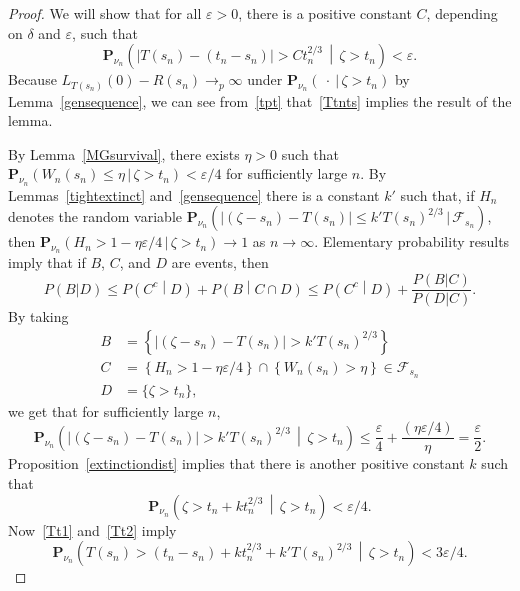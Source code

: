 \documentclass[10pt]{amsart}
\theoremstyle{definition}\newtheorem{defi}[theo]{Definition}\newtheorem{rema}[theo]{Remark}\newtheorem{exam}[theo]{Example}\newtheorem{exem}[theo]{Example}\newtheorem{nota}[theo]{Notation}
\newcommand*\eps{\varepsilon}
\renewcommand*\P{\mathbf{P}}
\newcommand\F{\mathcal{F}}
\newcommand{\1} {\mathds{1}}
\begin{document}
\begin{proof}
We will show that for all $\eps > 0$, there is a positive constant $C$, depending on $\delta$ and $\eps$, such that
\begin{equation}\label{Ttnts}
\P_{\nu_n}\left(\left|T(s_n) - (t_n - s_n)\right| > C t_n^{2/3} \,\middle|\, \zeta > t_n\right) < \eps.
\end{equation}
Because $L_{T(s_n)}(0) - R(s_n) \rightarrow_p \infty$ under $\P_{\nu_n}(\: \cdot \:|\,\zeta > t_n)$ by Lemma~\ref{gensequence}, we can see from~\eqref{tpt} that~\eqref{Ttnts} implies the result of the lemma.

By Lemma~\ref{MGsurvival}, there exists $\eta > 0$ such that $\P_{\nu_n}(W_n(s_n) \leq \eta\,|\,\zeta > t_n) < \eps/4$ for sufficiently large $n$. By Lemmas~\ref{tightextinct} and~\ref{gensequence} there is a constant $k'$ such that, if $H_n$ denotes the random variable $\P_{\nu_n}(|(\zeta - s_n) - T(s_n)| \leq k' T(s_n)^{2/3}\,|\,\F_{s_n})$, then $\P_{\nu_n}(H_n > 1 - \eta \eps/4 \,|\, \zeta > t_n) \rightarrow 1$ as $n \rightarrow \infty$. Elementary probability results imply that if $B$, $C$, and $D$ are events, then
\[
P(B|D) \leq P\left(C^c\middle|D\right) + P\left(B\middle|C \cap D\right) \leq P\left(C^c\middle|D\right) + \frac{P(B|C)}{P(D|C)}.
\]
By taking
\begin{align*}
B &= \left\{\left|(\zeta - s_n) - T(s_n)\right| > k'T(s_n)^{2/3}\right\} \\
C &= \left\{H_n > 1 - \eta \eps/4\right\} \cap \left\{W_n(s_n) > \eta\right\} \in \F_{s_n} \\
D &= \{\zeta > t_n\},
\end{align*}
we get that for sufficiently large $n$,
\begin{equation}\label{Tt1}
\P_{\nu_n}\left(\left|(\zeta - s_n) - T(s_n)\right| > k'T(s_n)^{2/3} \,\middle|\, \zeta > t_n\right) \leq \frac{\eps}{4} + \frac{(\eta \eps/4)}{\eta} = \frac{\eps}{2}.
\end{equation}
Proposition~\ref{extinctiondist} implies that there is another positive constant $k$ such that
\begin{equation}\label{Tt2}
\P_{\nu_n}\left(\zeta > t_n + kt_n^{2/3} \,\middle|\, \zeta > t_n\right) < \eps/4.
\end{equation}
Now~\eqref{Tt1} and~\eqref{Tt2} imply
\begin{equation}\label{Tt3}
\P_{\nu_n}\left(T(s_n) > (t_n - s_n) + kt_n^{2/3} + k'T(s_n)^{2/3} \,\middle|\, \zeta > t_n\right) < 3 \eps/4.
\end{equation}


\end{proof}
\end{document}
